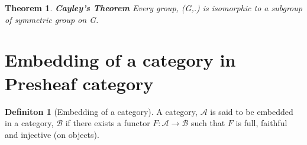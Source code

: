 \documentclass[18pt,a4paper]{article}
\newtheorem{theorem}{Theorem}[section]
\theoremstyle{definition}
\newtheorem{definition}{Definiton}[section]
\begin{document}
\begin{theorem}{\textbf{Cayley's Theorem}} %
	Every group, (G,.) is isomorphic to a subgroup of symmetric group on G.
\end{theorem}

\section{Embedding of a category in Presheaf category}%

\begin{definition}[Embedding of a category] %
	A category, $\mathcal{A}$  is said to be embedded in a category, $\mathcal{B}$ if there exists a
	functor $F: \mathcal{A} \to \mathcal{B} $ such that $F$ is full, faithful and injective (on objects).
\end{definition} %
\end{document}
